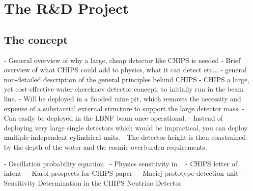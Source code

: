 \chapter{The \chips R\&D Project} %
\label{chap:chips}

\section{The \chips concept} %
\label{sec:chips_concept} %

- General overview of why a large, cheap detector like CHIPS is needed
- Brief overview of what CHIPS could add to physics, what it can detect etc...
- general non-detailed description of the general principles behind CHIPS
- CHIPS a large, yet cost-effective water chereknov detector concept, to initially run in the
\numi beam line.
- Will be deployed in a flooded mine pit, which removes the necessity and expense of a substantial
external structure to support the large detector mass.
- Can easily be deployed in the LBNF beam once operational.
- Instead of deploying very large single detectors which would be impractical, you can deploy
multiple independent cylindrical units.
- The detector height is then constrained by the depth of the water and the cosmic overburden
requirements.

- Oscillation probability equation~\cite{cervera2000}
- Physics sensitivity in ~\cite{pfutzner2017}
- CHIPS letter of intent~\cite{adamson2013}
- Karol prospects for CHIPS paper~\cite{lang2015}
- Maciej prototype detection unit~\cite{pfutznerProto2017}
- Sensitivity Determination in the CHIPS Neutrino Detector~\cite{adde2016}

